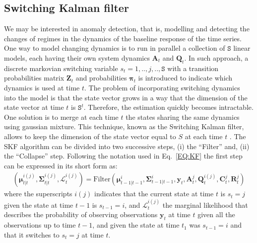 \subsection{Switching Kalman filter}
\label{SS:THSKF}
We may be interested in anomaly detection, that is, modelling and detecting the changes of regimes in the dynamics of the baseline response of the time series.
One way to model changing dynamics is to run in parallel a collection of ${\mathtt{S}}$ linear models, each having their own system dynamics $\mathbf{A}_{t}$ and $ \mathbf{Q}_{t}$.
In such approach, a discrete markovian switching variable $s_{t}= 1, ..,j,.. ,\mathtt{S}$ with a transition probabilities matrix $\mathbf{Z}_{t}$ and probabilities $\bm{\pi}_{t}$ is introduced to indicate which dynamics is used at time $t$.
The problem of incorporating switching dynamics into the model is that the state vector grows in a way that the dimension of the state vector at time $t$ is $\mathtt{S}^{t}$.
Therefore, the estimation quickly becomes intractable.
One solution is to merge at each time $t$ the states sharing the same dynamics using gaussian mixture.
This technique, known as the Switching Kalman filter, allows to keep the dimension of the state vector equal to $S$ at each time $t$ \cite{murphy2012machine}.
The SKF algorithm can be divided into two successive steps, (i) the ``Filter'' and, (ii) the ``Collapse'' step.
Following the notation used in Eq.~\ref{EQ:KF} the first step can be expressed in its short form as:
\begin{equation}
  \begin{split}
  (\bm{\mu}_{t|t}^{i(j)},\bm{\Sigma}_{t|t}^{i(j)}, \mathcal{L}_{t}^{i(j)}) = \text{Filter}(\bm{\mu}_{t-1|t-1}^{i},\bm{\Sigma}_{t-1|t-1}^{i}, \mathbf{y}_{t}, \mathbf{A}_{t}^{j},  \mathbf{Q}_{t}^{i(j)},   \mathbf{C}^{j}_{t},  \mathbf{R}^{j}_{t})
    \end{split}
\label{EQ:SKF1}
\end{equation}
where the superscripts $i(j)$ indicates that the current state at time $t$ is $s_{t}=j$ given the state at time $t-1$ is $s_{t-1}=i$, and
$ \mathcal{L}_{t}^{i(j)}$  the marginal likelihood that describes the probability of observing observations $\mathbf{y}_{t}$ at time $t$ given all the observations up to time $t-1$, and given the state at time $t_1$ was $s_{t-1} = i$ and that it switches to $s_{t} = j$ at time $t$.
